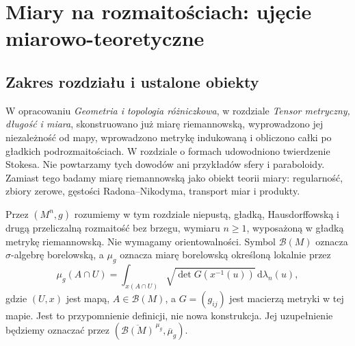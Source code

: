 \chapter[Miary na rozmaitościach]{Miary na rozmaitościach: ujęcie miarowo-teoretyczne}
\label{ch:miary-rozmaitosci-27}

\section{Zakres rozdziału i ustalone obiekty}
W opracowaniu \emph{Geometria i topologia różniczkowa}, w rozdziale
\emph{Tensor metryczny, długość i miara}, skonstruowano już
miarę riemannowską, wyprowadzono jej niezależność od mapy,
wprowadzono metrykę indukowaną i obliczono całki po gładkich
podrozmaitościach. W rozdziale o formach udowodniono twierdzenie
Stokesa. Nie powtarzamy tych dowodów ani przykładów
sfery i paraboloidy. Zamiast tego badamy miarę riemannowską
jako obiekt teorii miary: regularność, zbiory zerowe,
gęstości Radona--Nikodyma, transport miar i produkty.

Przez $(M^n,g)$ rozumiemy w tym rozdziale niepustą, gładką,
Hausdorffowską i drugą przeliczalną rozmaitość bez brzegu,
wymiaru $n\ge1$, wyposażoną w gładką metrykę riemannowską.
Nie wymagamy orientowalności. Symbol $\mathcal B(M)$ oznacza
$\sigma$-algebrę borelowską, a $\mu_g$ oznacza miarę
borelowską określoną lokalnie przez
\begin{equation}\label{eq:g-density-27}
  \mu_g(A\cap U)=\int_{x(A\cap U)}
  \sqrt{\det G(x^{-1}(u))}\,\mathrm d\lambda_n(u),
\end{equation}
gdzie $(U,x)$ jest mapą, $A\in\mathcal B(M)$,
a $G=(g_{ij})$ jest macierzą metryki w tej mapie.
Jest to przypomnienie definicji, nie nowa konstrukcja.
Jej uzupełnienie będziemy oznaczać przez
$(\overline{\mathcal B(M)}^{\,\mu_g},\overline\mu_g)$.

